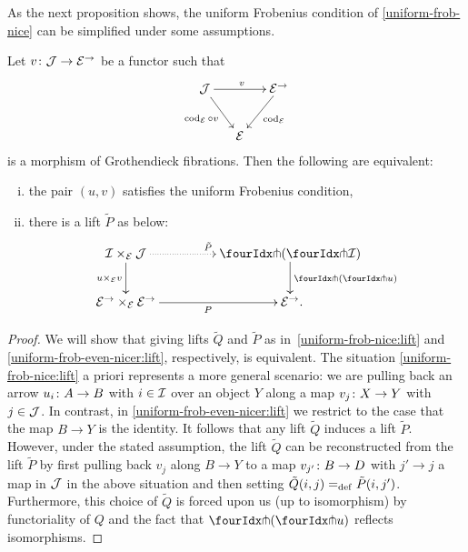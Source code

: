 \documentclass[reqno,10pt,a4paper,oneside,draft]{amsart}
\begin{document}
{{As the next proposition shows, the uniform Frobenius condition of \cref{uniform-frob-nice} can be simplified under some assumptions.

\begin{proposition}
\label{uniform-frob-even-nicer}
Let $v \co \cal{J} \to \cal{E}^\to$ be a functor such that
\begin{equation} \label{uniform-frob:comprehension}
\begin{gathered}
\xymatrix@C-1em{
  \cal{J}
  \ar[rr]^{v}
  \ar[dr]_{\cod_{\cal{E}} \cc v}
&&
  \cal{E}^\to
  \ar[dl]^{\cod_{\cal{E}}}
\\&
  \cal{E}
}
\end{gathered}
\end{equation}
is a morphism of Grothendieck fibrations. Then the following are equivalent:
\begin{enumerate}[(i)] 
\item the pair $(u, v)$ satisfies the  uniform Frobenius condition,
\item there is a lift $\tilde{P}$ as below:
\begin{equation} \label{uniform-frob-even-nicer:lift}
\begin{gathered}
\xymatrix@C+2em{
  \cal{I} \times_{\cal{E}} \cal{J}
  \ar@{.>}[r]^{\tilde{P}}
  \ar[d]_{u \times_{\cal{E}} v}
&
  \liftl{(\liftr{\cal{I}})}
  \ar[d]^{\liftl{(\liftr{u})}}
\\
  \cal{E}^\to \times_{\cal{E}} \cal{E}^\to
  \ar[r]_{P}
&
  \cal{E}^\to
\rlap{.}}
\end{gathered}
\end{equation}
\end{enumerate}
\end{proposition}

\begin{proof}
We will show that giving lifts $\tilde{Q}$ and $\tilde{P}$ as in~\eqref{uniform-frob-nice:lift} and \eqref{uniform-frob-even-nicer:lift}, respectively,
is equivalent.
The situation \eqref{uniform-frob-nice:lift} a priori represents a more general scenario: we are pulling back an arrow $u_i \co A \to B$ with $i \in \cal{I}$ over an object $Y$ along a map $v_j \co X \to Y$ with $j \in \cal{J}$.
In contrast, in \eqref{uniform-frob-even-nicer:lift} we restrict to the case that the map $B \to Y$ is the identity.
It follows that any lift $\tilde{Q}$ induces a lift $\tilde{P}$.
However, under the stated assumption, the lift $\tilde{Q}$ can be reconstructed from the lift $\tilde{P}$ by first pulling back $v_j$ along $B \to Y$ to a map $v_{j'} \co B \to D$ with $j' \to j$ a map in $\cal{J}$ in the above situation and then setting $\tilde{Q}(i, j) \defeq \tilde{P}(i, j')$.
Furthermore, this choice of $\tilde{Q}$ is forced upon us (up to isomorphism) by functoriality of $Q$ and the fact that $\liftl{(\liftr{u})}$ reflects isomorphisms.
\end{proof}

}}
\end{document}
